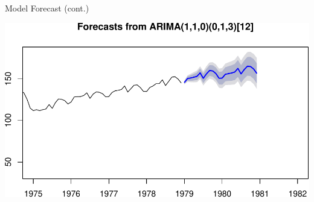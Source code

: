 \documentclass[11pt,ignorenonframetext,]{beamer}
\newenvironment{Shaded}{}{}
\newcommand{\DataTypeTok}[1]{\textcolor[rgb]{0.56,0.13,0.00}{#1}}
\newcommand{\DecValTok}[1]{\textcolor[rgb]{0.25,0.63,0.44}{#1}}
\newcommand{\FloatTok}[1]{\textcolor[rgb]{0.25,0.63,0.44}{#1}}
\newcommand{\KeywordTok}[1]{\textcolor[rgb]{0.00,0.44,0.13}{\textbf{#1}}}
\newcommand{\NormalTok}[1]{#1}
\newcommand{\OperatorTok}[1]{\textcolor[rgb]{0.40,0.40,0.40}{#1}}
\newcommand{\StringTok}[1]{\textcolor[rgb]{0.25,0.44,0.63}{#1}}
\let\oldShaded\Shaded
\let\endoldShaded\endShaded
\renewenvironment{Shaded}{\footnotesize\begin{spacing}{0.9}\oldShaded}{\endoldShaded\end{spacing}}
\begin{document}
\begin{frame}[fragile]{%
\protect\hypertarget{model-forecast-cont.}{%
Model Forecast (cont.)}}

\begin{Shaded}
\end{Shaded}

\begin{center}\includegraphics[width=\textwidth]{Lec11_files/figure-beamer/unnamed-chunk-30-1} \end{center}

\end{frame}
\end{document}
